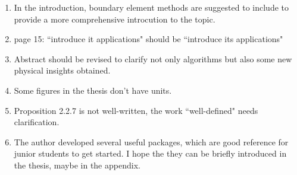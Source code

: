 \documentclass[aps,prl,reprint,showpacs,floatfix,superscriptaddress, onecolumn, 12pt]{revtex4-2}
\newcommand{\ar}[1]{{\color{blue}{Authors' response: #1}}} %
\begin{document}
\begin{enumerate}

\item In the introduction, boundary element methods are suggested to include to provide a more comprehensive introcution to the topic.

\ar{
    Thank you for the suggestion, it is true that boundary element methods are a powerful tool to solve the Poisson equation with complex boundary conditions. A brief introduction to boundary element methods has been added to the introduction (page 3 and 4).
}

\item page 15: ``introduce it applications" should be ``introduce its applications"

\ar{
    The typo has been corrected.
}

\item Abstract should be revised to clarify not only algorithms but also some new physical insights obtained.

\ar{
    In the revised version, I have added a new paragraph to the abstract to clarify the new physical insights obtained.
}

\item Some figures in the thesis don't have units.

\item Proposition 2.2.7 is not well-written, the work ``well-defined" needs clarification.

\item The author developed several useful packages, which are good reference for junior students to get started. I hope the they can be briefly introduced in the thesis, maybe in the appendix.

\end{enumerate}
\end{document}

